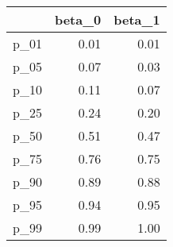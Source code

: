 \begin{table}[ht]
\centering
\begin{tabular}{rrr}
  \hline
 & beta\_0 & beta\_1 \\ 
  \hline
p\_01 & 0.01 & 0.01 \\ 
  p\_05 & 0.07 & 0.03 \\ 
  p\_10 & 0.11 & 0.07 \\ 
  p\_25 & 0.24 & 0.20 \\ 
  p\_50 & 0.51 & 0.47 \\ 
  p\_75 & 0.76 & 0.75 \\ 
  p\_90 & 0.89 & 0.88 \\ 
  p\_95 & 0.94 & 0.95 \\ 
  p\_99 & 0.99 & 1.00 \\ 
   \hline
\end{tabular}
\end{table}
